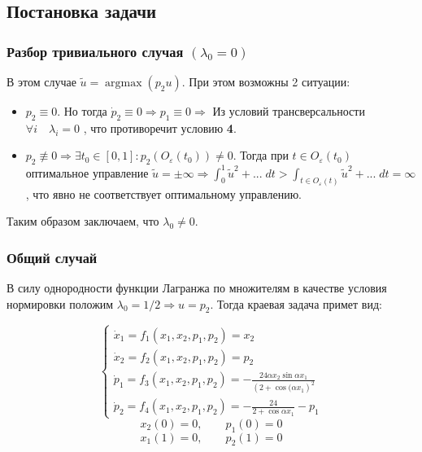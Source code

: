 \documentclass[a4paper,12pt]{article}
\DeclareMathOperator*{\argmax}{argmax}
\begin{document}
\subsection*{Постановка задачи}

\subsubsection*{Разбор тривиального случая \((\lambda_0=0)\)}

В этом случае \(\tilde{u}=\argmax(p_2 u)\). При этом возможны 2
ситуации:

\begin{itemize}
\item
  \(p_2 \equiv 0\). Но тогда
  \(\dot{p}_2\equiv 0 \Rightarrow p_1 \equiv 0 \Rightarrow\) Из условий
  трансверсальности \(\forall i \quad \lambda_i=0\) , что противоречит
  условию \textbf{4}.
\item
  \(p_2 \not\equiv 0 \Rightarrow \exists t_0 \in [0, 1] : p_2\left(O_{\varepsilon}(t_0)\right) \neq 0\).
  Тогда при \(t\in O_{\varepsilon}(t_0)\) оптимальное управление
  \(\tilde{u}=\pm\infty \Rightarrow \int_0^1 \tilde{u}^2+...\;dt > \int_{t\in O_\varepsilon(t)}\tilde{u}^2+...\;dt=\infty\),
  что явно не соответствует оптимальному управлению.
\end{itemize}

Таким образом заключаем, что \(\lambda_0 \neq 0\).

\subsubsection*{Общий случай}

В силу однородности функции Лагранжа по множителям в качестве условия
нормировки положим \(\lambda_0=1/2 \Rightarrow u=p_2\). Тогда краевая
задача примет вид:

\begin{equation}
  \label{common_system}
  \begin{cases}
    \dot{x}_1=f_1(x_1,x_2,p_1,p_2)=x_2\\
    \dot{x}_2=f_2(x_1,x_2,p_1,p_2)=p_2 \\
    \dot{p}_1=f_3(x_1,x_2,p_1,p_2)=-\frac{24\alpha x_2\sin{\alpha x_1}}{\left(2+\cos(\alpha x_1\right)^2}\\
    \dot{p}_2=f_4(x_1,x_2,p_1,p_2)=-\frac{24}{2+\cos{\alpha x_1}}-p_1
    \end{cases}
\end{equation}
\begin{equation}
  \label{left_conditions}
  x_2(0)=0, \quad \quad p_1(0)=0
\end{equation}
\begin{equation}
  \label{right_conditions}
  x_1(1)=0, \quad \quad p_2(1)=0
\end{equation}
\end{document}
